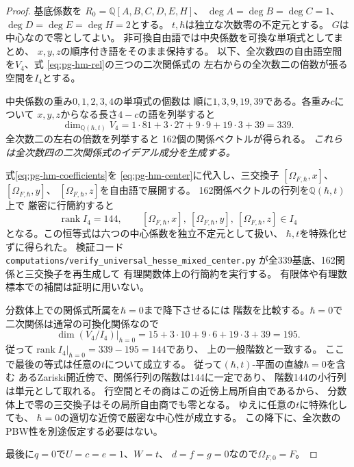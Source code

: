 \begin{proof}
基底係数を
$R_0=\mathbb Q[A,B,C,D,E,H]$、
$\deg A=\deg B=\deg C=1$、
$\deg D=\deg E=\deg H=2$とする。
$t,\hbar$は独立な次数零の不定元とする。
$G$は中心なので零としてよい。
非可換自由語では中央係数を可換な単項式としてまとめ、
$x,y,z$の順序付き語をそのまま保持する。
以下、全次数四の自由語空間を$V_4$、式
\eqref{eq:pg-hm-rel}の三つの二次関係式の
左右からの全次数二の倍数が張る空間を$I_4$とする。

中央係数の重み$0,1,2,3,4$の単項式の個数は
順に$1,3,9,19,39$である。各重み$c$について
$x,y,z$からなる長さ$4-c$の語を列挙すると
\begin{equation}
 \dim_{\mathbb Q(\hbar,t)}V_4
 =1\cdot81+3\cdot27+9\cdot9+19\cdot3+39=339.
\end{equation}
全次数二の左右の倍数を列挙すると
162個の関係ベクトルが得られる。
\emph{これらは全次数四の二次関係式のイデアル成分を生成する。}

式\eqref{eq:pg-hm-coefficients}を
\eqref{eq:pg-hm-center}に代入し、三交換子
$[\Omega_{F,\hbar},x]$、$[\Omega_{F,\hbar},y]$、
$[\Omega_{F,\hbar},z]$を自由語で展開する。
162関係ベクトルの行列を$\mathbb Q(\hbar,t)$上で
厳密に行簡約すると
\begin{equation}
 \operatorname{rank}I_4=144,\qquad
 [\Omega_{F,\hbar},x],\
 [\Omega_{F,\hbar},y],\
 [\Omega_{F,\hbar},z]\in I_4
 \label{eq:pg-hm-certificate}
\end{equation}
となる。この恒等式は六つの中心係数を独立不定元として扱い、
$\hbar,t$を特殊化せずに得られた。
検証コード
\texttt{computations/verify\_universal\_hesse\_mixed\_center.py}
が全339基底、162関係と三交換子を再生成して
有理関数体上の行簡約を実行する。
有限体や有理数標本での補間は証明に用いない。

分数体上での関係式所属を$\hbar=0$まで降下させるには
階数を比較する。$\hbar=0$で二次関係は通常の可換化関係なので
\begin{equation}
 \dim(V_4/I_4)|_{\hbar=0}
 =15+3\cdot10+9\cdot6+19\cdot3+39=195.
\end{equation}
従って$\operatorname{rank}I_4|_{\hbar=0}=339-195=144$であり、
上の一般階数と一致する。
ここで最後の等式は任意の$t$について成立する。
従って$(\hbar,t)$-平面の直線$\hbar=0$を含む
あるZariski開近傍で、関係行列の階数は144に一定であり、
階数144の小行列は単元として取れる。
行空間とその商はこの近傍上局所自由であるから、
分数体上で零の三交換子はその局所自由商でも零となる。
ゆえに任意の$t$に特殊化しても、
$\hbar=0$の適切な近傍で厳密な中心性が成立する。
この降下に、全次数のPBW性を別途仮定する必要はない。

最後に$q=0$で$U=c=e=1$、$W=t$、
$d=f=g=0$なので$\Omega_{F,0}=F$。
\end{proof}

